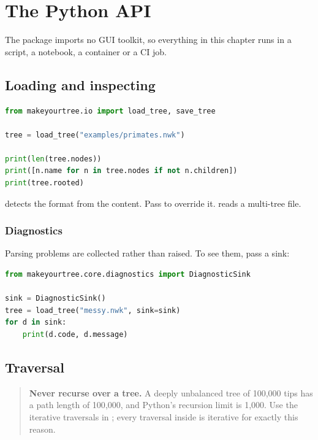 \chapter{The Python API}
\label{ch:python}

The  package imports no GUI toolkit, so everything in this
chapter runs in a script, a notebook, a container or a CI job.

\section{Loading and inspecting}

\begin{lstlisting}[language=Python]
from makeyourtree.io import load_tree, save_tree

tree = load_tree("examples/primates.nwk")

print(len(tree.nodes))
print([n.name for n in tree.nodes if not n.children])
print(tree.rooted)
\end{lstlisting}

 detects the format from the content. Pass  to
override it.  reads a multi-tree file.

\subsection{Diagnostics}

Parsing problems are collected rather than raised. To see them, pass a sink:

\begin{lstlisting}[language=Python]
from makeyourtree.core.diagnostics import DiagnosticSink

sink = DiagnosticSink()
tree = load_tree("messy.nwk", sink=sink)
for d in sink:
    print(d.code, d.message)
\end{lstlisting}

\section{Traversal}

\begin{quote}
\textbf{Never recurse over a tree.} A deeply unbalanced tree of 100{,}000 tips
has a path length of 100{,}000, and Python's recursion limit is 1{,}000. Use the
iterative traversals in ; every traversal inside
\app{} is iterative for exactly this reason.
\end{quote}

